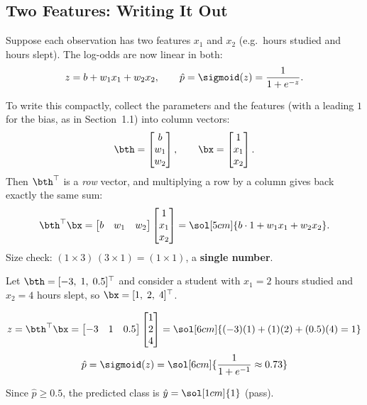 \documentclass[12pt, a4paper]{article}
\begin{document}
\subsection{Two Features: Writing It Out}

Suppose each observation has two features $x_1$ and $x_2$
(e.g.\ hours studied and hours slept).
The log-odds are now linear in both:
\[
  z = b + w_1 x_1 + w_2 x_2,
  \qquad
  \hat{p} = \sigmoid(z) = \frac{1}{1 + e^{-z}}.
\]

To write this compactly, collect the parameters and the features
(with a leading $1$ for the bias, as in Section~1.1) into column vectors:
\[
  \bth = \begin{bmatrix} b \\ w_1 \\ w_2 \end{bmatrix},
  \qquad
  \bx = \begin{bmatrix} 1 \\ x_1 \\ x_2 \end{bmatrix}.
\]
Then $\bth^{\top}$ is a \emph{row} vector, and multiplying a row by a column
gives back exactly the same sum:
\[
  \bth^{\top}\bx
  = \begin{bmatrix} b & w_1 & w_2 \end{bmatrix}
  \begin{bmatrix} 1 \\ x_1 \\ x_2 \end{bmatrix}
  = \sol[5cm]{b \cdot 1 + w_1 x_1 + w_2 x_2}.
\]
Size check: $(1 \times 3)\,(3 \times 1) = (1 \times 1)$, a \textbf{single number}.

\begin{example}
  Let $\bth = [-3,\; 1,\; 0.5]^{\top}$ and consider a student with
  $x_1 = 2$ hours studied and $x_2 = 4$ hours slept, so
  $\bx = [1,\; 2,\; 4]^{\top}$.

  \[
    z = \bth^{\top}\bx
    = \begin{bmatrix} -3 & 1 & 0.5 \end{bmatrix}
    \begin{bmatrix} 1 \\ 2 \\ 4 \end{bmatrix}
    = \sol[6cm]{(-3)(1) + (1)(2) + (0.5)(4) = 1}
  \]
  \[
    \hat{p} = \sigmoid(z) = \sol[6cm]{\frac{1}{1 + e^{-1}} \approx 0.73}
  \]

  Since $\hat{p} \ge 0.5$, the predicted class is $\hat{y} = \sol[1cm]{1}$ (pass).
\end{example}
\end{document}
